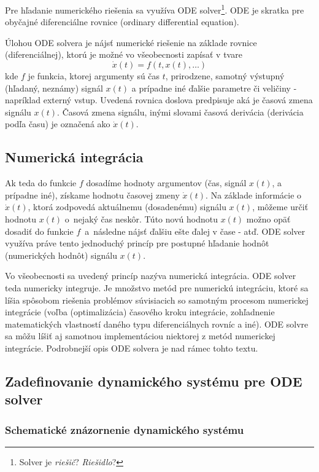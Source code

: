 \documentclass[a4paper, 10pt, ]{article}
\begin{document}
Pre hľadanie numerického riešenia sa využíva ODE solver\footnote{Solver je \emph{riešič}?  \emph{Riešidlo}?}. ODE je skratka pre obyčajné diferenciálne rovnice (ordinary differential equation).

Úlohou ODE solvera je nájsť numerické riešenie na základe rovnice (diferenciálnej), ktorú je možné vo všeobecnosti zapísať v tvare
\begin{equation} \label{fPreODESolver}
    \dot x(t) = f \left( t, x(t), \ldots \right)
\end{equation}
kde $f$ je funkcia, ktorej argumenty sú čas $t$, prirodzene, samotný výstupný (hľadaný, neznámy) signál $x(t)$ a prípadne iné ďalšie parametre či veličiny - napríklad externý vstup. Uvedená rovnica doslova predpisuje aká je časová zmena signálu $x(t)$. Časová zmena signálu, inými slovami časová derivácia (derivácia podľa času) je označená ako $\dot x(t)$.


\subsection{Numerická integrácia}

Ak teda do funkcie $f$ dosadíme hodnoty argumentov (čas, signál $x(t)$, a prípadne iné), získame hodnotu časovej zmeny $\dot x(t)$. Na základe informácie o $\dot x(t)$, ktorá zodpovedá aktuálnemu (dosadenému) signálu $x(t)$, môžeme určiť hodnotu $x(t)$ o~nejaký čas neskôr. Túto novú hodnotu $x(t)$ možno opäť dosadiť do funkcie $f$~a~následne nájsť ďalšiu ešte ďalej v čase - atď. ODE solver využíva práve tento jednoduchý princíp pre postupné hľadanie hodnôt (numerických hodnôt) signálu $x(t)$.


Vo všeobecnosti sa uvedený princíp nazýva numerická integrácia. ODE solver teda numericky integruje. Je množstvo metód pre numerickú integráciu, ktoré sa líšia spôsobom riešenia problémov súvisiacich so samotným procesom numerickej integrácie (voľba (optimalizácia) časového kroku integrácie, zohľadnenie matematických vlastností daného typu diferenciálnych rovníc a iné). ODE solvre sa môžu líšiť aj samotnou implementáciou niektorej z metód numerickej integrácie. Podrobnejší opis ODE solvera je nad rámec tohto textu.



\subsection{Zadefinovanie dynamického systému pre ODE solver}


\subsubsection{Schematické znázornenie dynamického systému}
\end{document}
